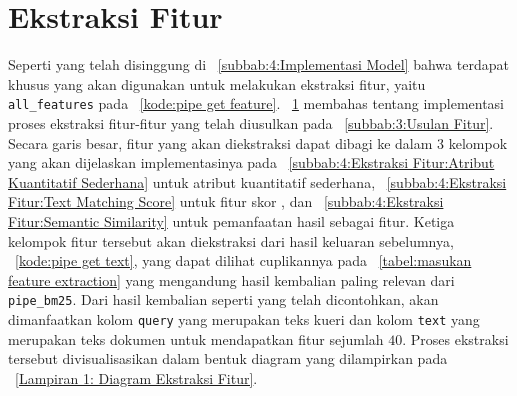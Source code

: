 \section{Ekstraksi Fitur}
\label{subbab:4:Ekstraksi Fitur}
Seperti yang telah disinggung di \subbab{}~\ref{subbab:4:Implementasi Model} bahwa terdapat \pipeline{} khusus yang akan digunakan untuk melakukan ekstraksi fitur, yaitu \pipeline{} \lstinline{all_features} pada \kode{}~\ref{kode:pipe get feature}. \subbab{}~\ref{subbab:4:Ekstraksi Fitur} membahas tentang implementasi proses ekstraksi fitur-fitur yang telah diusulkan pada \subbab{}~\ref{subbab:3:Usulan Fitur}. Secara garis besar, fitur yang akan diekstraksi dapat dibagi ke dalam 3 kelompok yang akan dijelaskan implementasinya pada \subbab{}~\ref{subbab:4:Ekstraksi Fitur:Atribut Kuantitatif Sederhana} untuk atribut kuantitatif sederhana, \subbab{}~\ref{subbab:4:Ekstraksi Fitur:Text Matching Score} untuk fitur skor \txt{} \matching{}, dan \subbab{}~\ref{subbab:4:Ekstraksi Fitur:Semantic Similarity} untuk pemanfaatan hasil \encoder{} sebagai fitur. Ketiga kelompok fitur tersebut akan diekstraksi dari hasil keluaran \pipeline{} sebelumnya, \kode{}~\ref{kode:pipe get text}, yang dapat dilihat cuplikannya pada \tabel{}~\ref{tabel:masukan feature extraction} yang mengandung hasil kembalian paling relevan dari \lstinline{pipe_bm25}. Dari hasil kembalian seperti yang telah dicontohkan, akan dimanfaatkan kolom \lstinline{query} yang merupakan teks kueri dan kolom \lstinline{text} yang merupakan teks dokumen untuk mendapatkan fitur sejumlah $40$. Proses ekstraksi tersebut divisualisasikan dalam bentuk diagram yang dilampirkan pada \gambar{}~\ref{Lampiran 1: Diagram Ekstraksi Fitur}.
\begin{table}[H]
    \centering
    \caption{Cuplikan hasil sebagai masukan \pipeline{} ekstraksi fitur}
    \label{tabel:masukan feature extraction}
\end{table}

